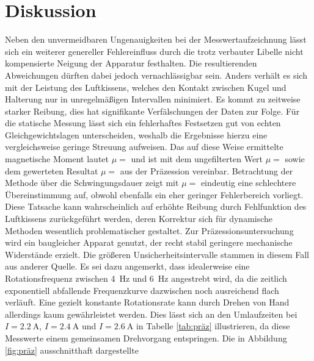 \section{Diskussion}
\label{sec:diskussion}

Neben den unvermeidbaren Ungenauigkeiten bei der Messwertaufzeichnung lässt sich ein weiterer genereller Fehlereinfluss
durch die trotz verbauter Libelle nicht kompensierte Neigung der Apparatur festhalten. Die resultierenden Abweichungen
dürften dabei jedoch vernachlässigbar sein. Anders verhält es sich mit der Leistung des Luftkissens, welches den Kontakt
zwischen Kugel und Halterung nur in unregelmäßigen Intervallen minimiert. Es kommt zu zeitweise starker Reibung, dies
hat signifikante Verfälschungen der Daten zur Folge. Für die statische Messung lässt sich ein fehlerhaftes Festsetzen
gut von echten Gleichgewichtslagen unterscheiden, weshalb die Ergebnisse hierzu eine vergleichsweise geringe Streuung
aufweisen. Das auf diese Weise ermittelte magnetische Moment lautet $\mu = $ und ist mit dem
ungefilterten Wert $\mu = $ sowie dem gewerteten Resultat $\mu = $
aus der Präzession vereinbar. Betrachtung der Methode über die Schwingungsdauer zeigt mit $\mu = $
eindeutig eine schlechtere Übereinstimmung auf, obwohl ebenfalls ein eher geringer Fehlerbereich vorliegt. Diese
Tatsache kann wahrscheinlich auf erhöhte Reibung durch Fehlfunktion des Luftkissens zurückgeführt werden, deren
Korrektur sich für dynamische Methoden wesentlich problematischer gestaltet. Zur Präzessionsuntersuchung wird ein
baugleicher Apparat genutzt, der recht stabil geringere mechanische Widerstände erzielt. Die größeren
Unsicherheitsintervalle stammen in diesem Fall aus anderer Quelle. Es sei dazu angemerkt, dass idealerweise eine
Rotationsfrequenz zwischen \qty{4}{\hertz} und \qty{6}{\hertz} angestrebt wird, da die zeitlich exponentiell
abfallende Frequenzkurve dazwischen noch ausreichend flach verläuft. Eine gezielt konstante Rotationsrate kann durch
Drehen von Hand allerdings kaum gewährleistet werden. Dies lässt sich an den Umlaufzeiten bei $I = \qty{2.2}{\ampere}$,
$I = \qty{2.4}{\ampere}$ und $I = \qty{2.6}{\ampere}$ in Tabelle \ref{tab:präz} illustrieren, da diese Messwerte
einem gemeinsamen Drehvorgang entspringen. Die in Abbildung \ref{fig:präz} ausschnitthaft dargestellte
